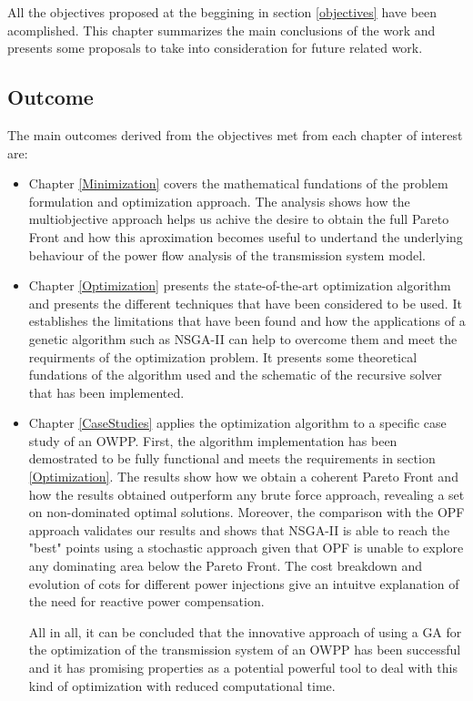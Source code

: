\documentclass[a4paper,11pt, titlepage, twoside]{article}
\begin{document}
All the objectives proposed at the beggining in section \ref{objectives} have been acomplished. This chapter summarizes
the main conclusions of the work and presents some proposals to take into consideration for future
related work.

\subsection{Outcome}

The main outcomes derived from the objectives met from each chapter of interest are:
\begin{itemize}
    \item Chapter \ref{Minimization} covers the  mathematical fundations of the problem formulation and optimization approach. The analysis shows how the multiobjective approach helps us achive
    the desire to obtain the full Pareto Front and how this aproximation becomes useful to undertand the underlying behaviour of the power flow analysis of the transmission system model.

    \item Chapter \ref{Optimization} presents the state-of-the-art optimization algorithm and presents the different techniques that have been considered to be used.
    It establishes the limitations that have been found and how the applications of a genetic algorithm such as NSGA-II
    can help to overcome them and meet the requirments of the optimization problem. It presents some theoretical fundations of the algorithm used and the schematic of the recursive solver that has been implemented.

    \item Chapter \ref{CaseStudies} applies the optimization algorithm to a specific case study of an OWPP. First, the algorithm implementation has been demostrated to be fully functional and meets the requirements in section \ref{Optimization}.
    The results show how we obtain a coherent Pareto Front and how the results obtained outperform any brute force approach, revealing a set on non-dominated optimal solutions. Moreover, the comparison with the OPF approach validates our results and shows that
    NSGA-II is able to reach the "best" points using a stochastic approach given that OPF is unable to explore any dominating area below the Pareto Front. The cost breakdown and evolution of cots for different power injections give an intuitve 
    explanation of the need for reactive power compensation.\par
    All in all, it can be concluded that the innovative approach of using a GA for the optimization of the transmission system of an OWPP has been successful and it has promising properties as a potential powerful tool to deal with this kind of optimization
    with reduced computational time.

\end{itemize}
\end{document}
